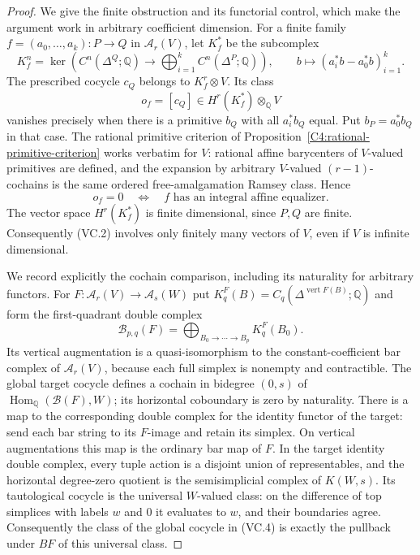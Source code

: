 \begin{proof}
We give the finite obstruction and its functorial control, which
make the argument work in arbitrary coefficient dimension.
For a finite family $f=(a_0,\ldots,a_k):P\to Q$ in
$\mathcal A_r(V)$, let $K_f^*$ be the subcomplex
\[
 K_f^n=\ker\left(
 C^n(\Delta^Q;\mathbb Q)\longrightarrow
 \bigoplus_{i=1}^k C^n(\Delta^P;\mathbb Q)\right),
 \qquad b\longmapsto(a_i^*b-a_0^*b)_{i=1}^k.
 \tag{VC.1}
\]
The prescribed cocycle $c_Q$ belongs to $K_f^r\otimes V$.
Its class
\[
 o_f=[c_Q]\in H^r(K_f^*)\otimes_{\mathbb Q}V
 \tag{VC.2}
\]
vanishes precisely when there is a primitive $b_Q$ with all
$a_i^*b_Q$ equal. Put $b_P=a_0^*b_Q$ in that case. The rational
primitive criterion of Proposition~\ref{C4:rational-primitive-criterion}
works verbatim for $V$: rational affine barycenters of $V$-valued
primitives are defined, and the expansion by arbitrary
$V$-valued $(r-1)$-cochains is the same ordered free-amalgamation
Ramsey class. Hence
\[
 o_f=0
 \quad\Longleftrightarrow\quad
 f\text{ has an integral affine equalizer}.
 \tag{VC.3}
\]
The vector space $H^r(K_f^*)$ is finite dimensional, since $P,Q$
are finite. Consequently (VC.2) involves only finitely many
vectors of $V$, even if $V$ is infinite dimensional.

We record explicitly the cochain comparison, including its
naturality for arbitrary functors. For
$F:\mathcal A_r(V)\to\mathcal A_s(W)$ put
$K_q^F(B)=C_q(\Delta^{\operatorname{vert}F(B)};\mathbb Q)$ and
form the first-quadrant double complex
\[
 \mathcal B_{p,q}(F)=
 \bigoplus_{B_0\to\cdots\to B_p}K_q^F(B_0).
 \tag{VC.4}
\]
Its vertical augmentation is a quasi-isomorphism to the
constant-coefficient bar complex of $\mathcal A_r(V)$, because
each full simplex is nonempty and contractible. The global
target cocycle defines a cochain in bidegree $(0,s)$ of
$\operatorname{Hom}_{\mathbb Q}(\mathcal B(F),W)$; its horizontal
coboundary is zero by naturality. There is a map to the
corresponding double complex for the identity functor of the
target: send each bar string to its $F$-image and retain its
simplex. On vertical augmentations this map is the ordinary
bar map of $F$. In the target identity double complex, every
tuple action is a disjoint union of representables, and the
horizontal degree-zero quotient is the semisimplicial complex
of $K(W,s)$. Its tautological cocycle is the universal
$W$-valued class: on the difference of top simplices with labels
$w$ and $0$ it evaluates to $w$, and their boundaries agree.
Consequently the class of the global cocycle in (VC.4) is
exactly the pullback under $BF$ of this universal class.


\end{proof}
